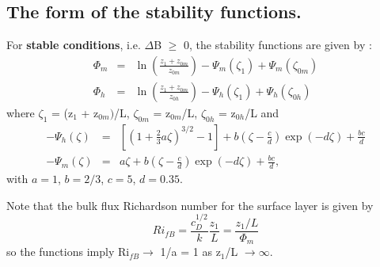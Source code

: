 \documentclass{UMDP_article}
\begin{document}
\subsection{The form of the stability functions.}
\label{section_1.3}
For \textbf{stable conditions}, i.e. $\Delta $B $\ge $ 0, the
stability functions are given by \cite{Beljaars1991}:
\begin{eqnarray}
  \Phi _m&=&\ln  \left( {\frac{ z_1 +  z_{0m} }{ z_{0m} }} \right) -  \Psi _m ( \zeta _1 ) +  \Psi _m ( \zeta _{0m} )
  \label{1.3.11}\\
  \Phi _h&=&\ln  \left( {\frac{ z_1 +  z_{0m} }{ z_{0h} }} \right) -  \Psi _h ( \zeta _1 ) +  \Psi _h ( \zeta _{0h} )
  \label{1.3.12}
\end{eqnarray}
where $\zeta _{1}$ = (z$_{1}$ + z$_{0m})$/L, $\zeta _{0m}$ =
z$_{0m}$/L, $\zeta _{0h}$ = z$_{0h}$/L and
\begin{eqnarray}
  - \Psi _h (\zeta )&=&\left[ {  {\left( {1 + \frac{2}{3}a\zeta } \right)}^{3/2} - 1 } \right] + b\left( {\zeta - \frac{c}{d}} \right)\exp (-d\zeta ) + \frac{bc}{d}
  \label{1.3.13}\\
  - \Psi _m (\zeta )&=&a\zeta + b\left( {\zeta - \frac{c}{d}} \right)\exp (-d\zeta ) + \frac{bc}{d},
  \label{1.3.14}
\end{eqnarray}
with $a = 1$, $b =2/3$, $c = 5$, $d = 0.35$.

Note that the bulk flux Richardson number for the surface layer is
given by
\begin{equation} {Ri}_{fB} = \frac{ c_D^{1/2} }{k} \frac{ z_1 }{L} =
  \frac{ z_1 /L}{ \Phi _m }
  \label{1.3.8}
\end{equation}
so the \cite{Beljaars1991} functions imply Ri$_{f B} \to $ 1/a = 1 as
z$_{1}$/L $\to \infty $.
\end{document}
